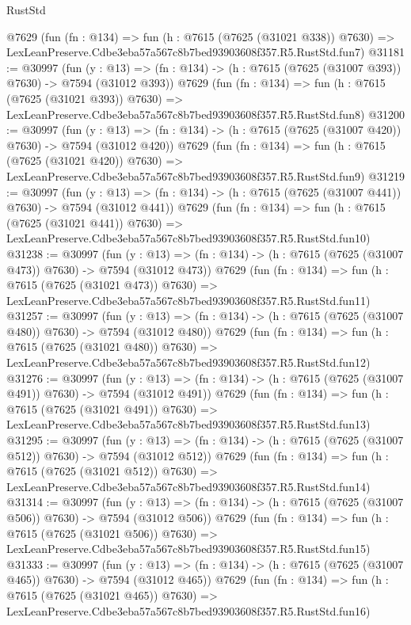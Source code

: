\begin{lexlean}{RustStd}
\begin{coremodule}
    @7629
    (fun (fn : @134) =>
    fun (h : @7615 (@7625 (@31021 @338)) @7630) =>
    LexLeanPreserve.Cdbe3eba57a567c8b7bed93903608f357.R5.RustStd.fun7)
@31181 := @30997
    (fun (y : @13) => (fn : @134) -> (h : @7615 (@7625 (@31007 @393)) @7630) -> @7594 (@31012 @393))
    @7629
    (fun (fn : @134) =>
    fun (h : @7615 (@7625 (@31021 @393)) @7630) =>
    LexLeanPreserve.Cdbe3eba57a567c8b7bed93903608f357.R5.RustStd.fun8)
@31200 := @30997
    (fun (y : @13) => (fn : @134) -> (h : @7615 (@7625 (@31007 @420)) @7630) -> @7594 (@31012 @420))
    @7629
    (fun (fn : @134) =>
    fun (h : @7615 (@7625 (@31021 @420)) @7630) =>
    LexLeanPreserve.Cdbe3eba57a567c8b7bed93903608f357.R5.RustStd.fun9)
@31219 := @30997
    (fun (y : @13) => (fn : @134) -> (h : @7615 (@7625 (@31007 @441)) @7630) -> @7594 (@31012 @441))
    @7629
    (fun (fn : @134) =>
    fun (h : @7615 (@7625 (@31021 @441)) @7630) =>
    LexLeanPreserve.Cdbe3eba57a567c8b7bed93903608f357.R5.RustStd.fun10)
@31238 := @30997
    (fun (y : @13) => (fn : @134) -> (h : @7615 (@7625 (@31007 @473)) @7630) -> @7594 (@31012 @473))
    @7629
    (fun (fn : @134) =>
    fun (h : @7615 (@7625 (@31021 @473)) @7630) =>
    LexLeanPreserve.Cdbe3eba57a567c8b7bed93903608f357.R5.RustStd.fun11)
@31257 := @30997
    (fun (y : @13) => (fn : @134) -> (h : @7615 (@7625 (@31007 @480)) @7630) -> @7594 (@31012 @480))
    @7629
    (fun (fn : @134) =>
    fun (h : @7615 (@7625 (@31021 @480)) @7630) =>
    LexLeanPreserve.Cdbe3eba57a567c8b7bed93903608f357.R5.RustStd.fun12)
@31276 := @30997
    (fun (y : @13) => (fn : @134) -> (h : @7615 (@7625 (@31007 @491)) @7630) -> @7594 (@31012 @491))
    @7629
    (fun (fn : @134) =>
    fun (h : @7615 (@7625 (@31021 @491)) @7630) =>
    LexLeanPreserve.Cdbe3eba57a567c8b7bed93903608f357.R5.RustStd.fun13)
@31295 := @30997
    (fun (y : @13) => (fn : @134) -> (h : @7615 (@7625 (@31007 @512)) @7630) -> @7594 (@31012 @512))
    @7629
    (fun (fn : @134) =>
    fun (h : @7615 (@7625 (@31021 @512)) @7630) =>
    LexLeanPreserve.Cdbe3eba57a567c8b7bed93903608f357.R5.RustStd.fun14)
@31314 := @30997
    (fun (y : @13) => (fn : @134) -> (h : @7615 (@7625 (@31007 @506)) @7630) -> @7594 (@31012 @506))
    @7629
    (fun (fn : @134) =>
    fun (h : @7615 (@7625 (@31021 @506)) @7630) =>
    LexLeanPreserve.Cdbe3eba57a567c8b7bed93903608f357.R5.RustStd.fun15)
@31333 := @30997
    (fun (y : @13) => (fn : @134) -> (h : @7615 (@7625 (@31007 @465)) @7630) -> @7594 (@31012 @465))
    @7629
    (fun (fn : @134) =>
    fun (h : @7615 (@7625 (@31021 @465)) @7630) =>
    LexLeanPreserve.Cdbe3eba57a567c8b7bed93903608f357.R5.RustStd.fun16)

\end{coremodule}
\end{lexlean}

